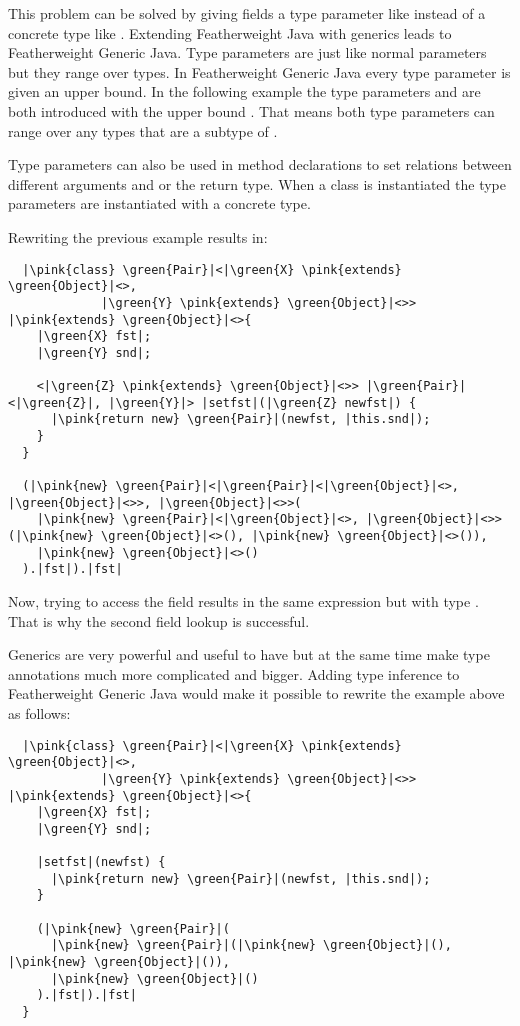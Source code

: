 This problem can be solved by giving fields a type parameter like  instead of a concrete type like .
Extending Featherweight Java with generics leads to Featherweight Generic Java.
Type parameters are just like normal parameters but they range over types. In Featherweight Generic Java every type parameter is given an upper bound.
In the following example the type parameters  and  are both introduced with the upper bound .
That means both type parameters can range over any types that are a subtype of .

Type parameters can also be used in method declarations to set relations between different arguments and or the return type.
When a class is instantiated the type parameters are instantiated with a concrete type.

Rewriting the previous example results in:

\begin{verbatim}
  |\pink{class} \green{Pair}|<|\green{X} \pink{extends} \green{Object}|<>,
             |\green{Y} \pink{extends} \green{Object}|<>> |\pink{extends} \green{Object}|<>{
    |\green{X} fst|;
    |\green{Y} snd|;

    <|\green{Z} \pink{extends} \green{Object}|<>> |\green{Pair}|<|\green{Z}|, |\green{Y}|> |setfst|(|\green{Z} newfst|) {
      |\pink{return new} \green{Pair}|(newfst, |this.snd|);
    }
  }

  (|\pink{new} \green{Pair}|<|\green{Pair}|<|\green{Object}|<>, |\green{Object}|<>>, |\green{Object}|<>>(
    |\pink{new} \green{Pair}|<|\green{Object}|<>, |\green{Object}|<>>(|\pink{new} \green{Object}|<>(), |\pink{new} \green{Object}|<>()),
    |\pink{new} \green{Object}|<>()
  ).|fst|).|fst|
\end{verbatim}

Now, trying to access the field  results in the same expression but with type . That is why the second field lookup is successful.

Generics are very powerful and useful to have but at the same time make type annotations much more complicated and bigger.
Adding type inference to Featherweight Generic Java would make it possible to rewrite the example above as follows:

\begin{verbatim}
  |\pink{class} \green{Pair}|<|\green{X} \pink{extends} \green{Object}|<>,
             |\green{Y} \pink{extends} \green{Object}|<>> |\pink{extends} \green{Object}|<>{
    |\green{X} fst|;
    |\green{Y} snd|;

    |setfst|(newfst) {
      |\pink{return new} \green{Pair}|(newfst, |this.snd|);
    }

    (|\pink{new} \green{Pair}|(
      |\pink{new} \green{Pair}|(|\pink{new} \green{Object}|(), |\pink{new} \green{Object}|()),
      |\pink{new} \green{Object}|()
    ).|fst|).|fst|
  }
\end{verbatim}

